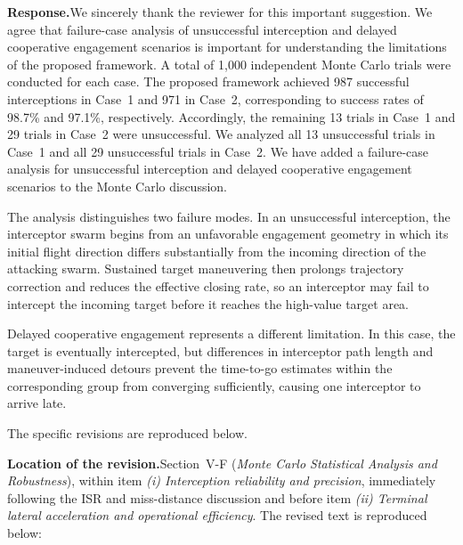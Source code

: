 \documentclass[11pt]{article}
\newcommand{\rsp}{\medskip\noindent\textbf{Response.}\quad}
\newcommand{\loc}{\medskip\noindent\textbf{Location of the revision.}\quad}
\begin{document}
\rsp We sincerely thank the reviewer for this important suggestion. 
We agree that failure-case analysis of unsuccessful interception and delayed 
cooperative engagement scenarios is important for understanding the limitations 
of the proposed framework. A total of 1,000 independent Monte Carlo trials 
were conducted for each case. The proposed framework achieved 987 successful 
interceptions in Case~1 and 971 in Case~2, corresponding to success rates of 98.7\% and 97.1\%, 
respectively. Accordingly, the remaining 13 trials in Case~1 and 29 trials in Case~2 were unsuccessful. 
We analyzed all 13 unsuccessful trials in Case~1 and all 29 unsuccessful trials in Case~2. 
We have added a failure-case analysis for unsuccessful interception and delayed cooperative 
engagement scenarios to the Monte Carlo discussion.


The analysis distinguishes two failure modes. In an unsuccessful
interception, the interceptor swarm begins from an unfavorable engagement
geometry in which its initial flight direction differs substantially from
the incoming direction of the attacking swarm. Sustained target maneuvering
then prolongs trajectory correction and reduces the effective closing rate,
so an interceptor may fail to intercept the incoming target before it reaches
the high-value target area.

Delayed cooperative engagement represents a different limitation. In this
case, the target is eventually intercepted, but differences in interceptor
path length and maneuver-induced detours prevent the time-to-go estimates
within the corresponding group from converging sufficiently, causing one
interceptor to arrive late. 

The specific revisions are reproduced below.

\loc Section~V-F (\emph{Monte Carlo Statistical Analysis and Robustness}),
within item \emph{(i) Interception reliability and precision}, immediately
following the ISR and miss-distance discussion and before item
\emph{(ii) Terminal lateral acceleration and operational efficiency}. The
revised text is reproduced below:
\end{document}
